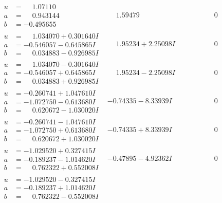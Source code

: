 \documentclass[1p]{elsarticle_modified}
\theoremstyle{definition}
\begin{document}
$$\begin{array}{c|c|c}
\begin{aligned}
u &= \phantom{-}1.07110\phantom{ +0.000000I} \\
a &= \phantom{-}0.943144\phantom{ +0.000000I} \\
b &= -0.495655\phantom{ +0.000000I}\end{aligned}
 & \phantom{-}1.59479\phantom{ +0.000000I} & \phantom{-0.000000 } 0 \\ \hline\begin{aligned}
u &= \phantom{-}1.034070 + 0.301640 I \\
a &= -0.546057 - 0.645865 I \\
b &= \phantom{-}0.034883 - 0.926985 I\end{aligned}
 & \phantom{-}1.95234 + 2.25098 I & \phantom{-0.000000 } 0 \\ \hline\begin{aligned}
u &= \phantom{-}1.034070 - 0.301640 I \\
a &= -0.546057 + 0.645865 I \\
b &= \phantom{-}0.034883 + 0.926985 I\end{aligned}
 & \phantom{-}1.95234 - 2.25098 I & \phantom{-0.000000 } 0 \\ \hline\begin{aligned}
u &= -0.260741 + 1.047610 I \\
a &= -1.072750 - 0.613680 I \\
b &= \phantom{-}0.620672 - 1.030020 I\end{aligned}
 & -0.74335 - 8.33939 I & \phantom{-0.000000 } 0 \\ \hline\begin{aligned}
u &= -0.260741 - 1.047610 I \\
a &= -1.072750 + 0.613680 I \\
b &= \phantom{-}0.620672 + 1.030020 I\end{aligned}
 & -0.74335 + 8.33939 I & \phantom{-0.000000 } 0 \\ \hline\begin{aligned}
u &= -1.029520 + 0.327415 I \\
a &= -0.189237 - 1.014620 I \\
b &= \phantom{-}0.762322 + 0.552008 I\end{aligned}
 & -0.47895 - 4.92362 I & \phantom{-0.000000 } 0 \\ \hline\begin{aligned}
u &= -1.029520 - 0.327415 I \\
a &= -0.189237 + 1.014620 I \\
b &= \phantom{-}0.762322 - 0.552008 I\end{aligned}

\end{array}$$
\end{document}
